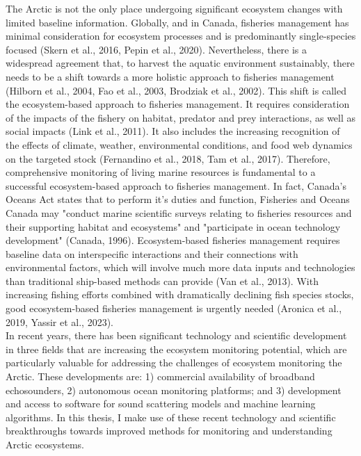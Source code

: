 The Arctic is not the only place undergoing significant ecosystem changes with limited baseline information. Globally, and in Canada, fisheries management has minimal consideration for ecosystem processes and is predominantly single-species focused (Skern et al., 2016, Pepin et al., 2020). Nevertheless, there is a widespread agreement that, to harvest the aquatic environment sustainably, there needs to be a shift towards a more holistic approach to fisheries management (Hilborn et al., 2004, Fao et al., 2003, Brodziak et al., 2002). This shift is called the ecosystem-based approach to fisheries management. It requires consideration of the impacts of the fishery on habitat, predator and prey interactions, as well as social impacts (Link et al., 2011). It also includes the increasing recognition of the effects of climate, weather, environmental conditions, and food web dynamics on the targeted stock (Fernandino et al., 2018, Tam et al., 2017). Therefore, comprehensive monitoring of living marine resources is fundamental to a successful ecosystem-based approach to fisheries management. In fact, Canada's Oceans Act states that to perform it's duties and function, Fisheries and Oceans Canada may "conduct marine scientific surveys relating to fisheries resources and their supporting habitat and ecosystems" and "participate in ocean technology development" (Canada, 1996). Ecosystem-based fisheries management requires baseline data on interspecific interactions and their connections with environmental factors, which will involve much more data inputs and technologies than traditional ship-based methods can provide (Van et al., 2013). With increasing fishing efforts combined with dramatically declining fish species stocks, good ecosystem-based fisheries management is urgently needed (Aronica et al., 2019, Yassir et al., 2023).\\
In recent years, there has been significant technology and scientific development in three fields that are increasing the ecosystem monitoring potential, which are particularly valuable for addressing the challenges of ecosystem monitoring the Arctic. These developments are: 1) commercial availability of broadband echosounders, 2) autonomous ocean monitoring platforms;  and 3) development and access to software for sound scattering models and machine learning algorithms. In this thesis, I make use of these recent technology and scientific breakthroughs towards improved methods for monitoring and understanding Arctic ecosystems.\\

